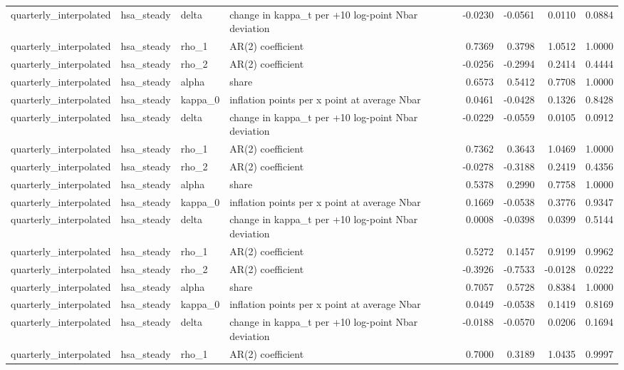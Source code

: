 \begin{tabular}{llllrrrr}
quarterly\_interpolated & hsa\_steady & delta & change in kappa\_t per +10 log-point Nbar deviation & -0.0230 & -0.0561 & 0.0110 & 0.0884 \\
quarterly\_interpolated & hsa\_steady & rho\_1 & AR(2) coefficient & 0.7369 & 0.3798 & 1.0512 & 1.0000 \\
quarterly\_interpolated & hsa\_steady & rho\_2 & AR(2) coefficient & -0.0256 & -0.2994 & 0.2414 & 0.4444 \\
quarterly\_interpolated & hsa\_steady & alpha & share & 0.6573 & 0.5412 & 0.7708 & 1.0000 \\
quarterly\_interpolated & hsa\_steady & kappa\_0 & inflation points per x point at average Nbar & 0.0461 & -0.0428 & 0.1326 & 0.8428 \\
quarterly\_interpolated & hsa\_steady & delta & change in kappa\_t per +10 log-point Nbar deviation & -0.0229 & -0.0559 & 0.0105 & 0.0912 \\
quarterly\_interpolated & hsa\_steady & rho\_1 & AR(2) coefficient & 0.7362 & 0.3643 & 1.0469 & 1.0000 \\
quarterly\_interpolated & hsa\_steady & rho\_2 & AR(2) coefficient & -0.0278 & -0.3188 & 0.2419 & 0.4356 \\
quarterly\_interpolated & hsa\_steady & alpha & share & 0.5378 & 0.2990 & 0.7758 & 1.0000 \\
quarterly\_interpolated & hsa\_steady & kappa\_0 & inflation points per x point at average Nbar & 0.1669 & -0.0538 & 0.3776 & 0.9347 \\
quarterly\_interpolated & hsa\_steady & delta & change in kappa\_t per +10 log-point Nbar deviation & 0.0008 & -0.0398 & 0.0399 & 0.5144 \\
quarterly\_interpolated & hsa\_steady & rho\_1 & AR(2) coefficient & 0.5272 & 0.1457 & 0.9199 & 0.9962 \\
quarterly\_interpolated & hsa\_steady & rho\_2 & AR(2) coefficient & -0.3926 & -0.7533 & -0.0128 & 0.0222 \\
quarterly\_interpolated & hsa\_steady & alpha & share & 0.7057 & 0.5728 & 0.8384 & 1.0000 \\
quarterly\_interpolated & hsa\_steady & kappa\_0 & inflation points per x point at average Nbar & 0.0449 & -0.0538 & 0.1419 & 0.8169 \\
quarterly\_interpolated & hsa\_steady & delta & change in kappa\_t per +10 log-point Nbar deviation & -0.0188 & -0.0570 & 0.0206 & 0.1694 \\
quarterly\_interpolated & hsa\_steady & rho\_1 & AR(2) coefficient & 0.7000 & 0.3189 & 1.0435 & 0.9997 \\

\end{tabular}
